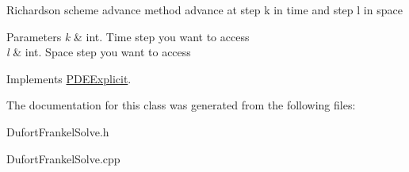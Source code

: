 Richardson scheme advance method advance at step k in time and step l in space 
\begin{DoxyParams}{Parameters}
{\em k} & int. Time step you want to access \\
\hline
{\em l} & int. Space step you want to access \\
\hline
\end{DoxyParams}


Implements \hyperlink{class_p_d_e_explicit_aed238f52510878474c02681904013dd3}{P\+D\+E\+Explicit}.



The documentation for this class was generated from the following files\+:\begin{DoxyCompactItemize}
\item 
Dufort\+Frankel\+Solve.\+h\item 
Dufort\+Frankel\+Solve.\+cpp\end{DoxyCompactItemize}
